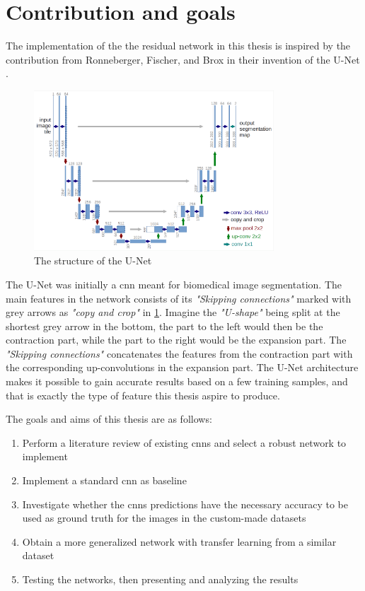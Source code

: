 \documentclass[USenglish]{ifimaster}  %
\begin{document}
\section{Contribution and goals}\label{contribution}
The implementation of the the residual network in this thesis is inspired by the contribution from Ronneberger, Fischer, and Brox in their invention of the U-Net \cite{website:u_net_article}. 
\begin{figure}[ht]
    \centering
    \includegraphics[width=0.8\textwidth]{bilder/u_net.png}
    \caption{The structure of the U-Net \cite{website:u_net}}
    \label{fig:u_net}
\end{figure}
The U-Net was initially a \ac{cnn} meant for biomedical image segmentation. The main features in the network consists of its \textit{"Skipping connections"} marked with grey arrows as \textit{"copy and crop"} in \cref{fig:u_net}. Imagine the \textit{"U-shape"} being split at the shortest grey arrow in the bottom, the part to the left would then be the contraction part, while the part to the right would be the expansion part. The \textit{"Skipping connections"} concatenates the features from the contraction part with the corresponding up-convolutions in the expansion part. The U-Net architecture makes it possible to gain accurate results based on a few training samples, and that is exactly the type of feature this thesis aspire to produce.

The goals and aims of this thesis are as follows:
\begin{enumerate}
    \item Perform a literature review of existing \acp{cnn} and select a robust network to implement
    \item Implement a standard \ac{cnn} as baseline
    \item Investigate whether the \acp{cnn} predictions have the necessary accuracy to be used as ground truth for the images in the custom-made datasets
    \item Obtain a more generalized network with transfer learning from a similar dataset
    \item Testing the networks, then presenting and analyzing the results
\end{enumerate}
\end{document}
